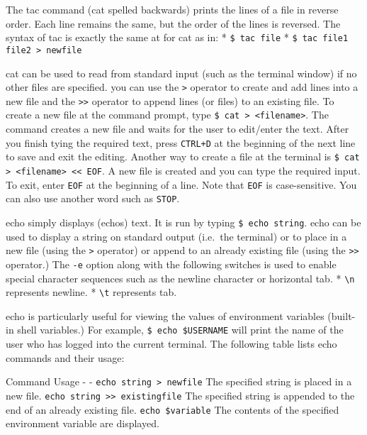 The tac command (cat spelled backwards) prints the lines of a file in
reverse order. Each line remains the same, but the order of the lines is
reversed. The syntax of tac is exactly the same at for cat as in: *
\texttt{\$ tac file} *
\texttt{\$ tac file1 file2 \textgreater{} newfile}

cat can be used to read from standard input (such as the terminal
window) if no other files are specified. you can use the
\texttt{\textgreater{}} operator to create and add lines into a new file
and the \texttt{\textgreater{}\textgreater{}} operator to append lines
(or files) to an existing file. To create a new file at the command
prompt, type
\texttt{\$ cat \textgreater{} \textless{}filename\textgreater{}}. The
command creates a new file and waits for the user to edit/enter the
text. After you finish tying the required text, press \texttt{CTRL+D} at
the beginning of the next line to save and exit the editing. Another way
to create a file at the terminal is
\texttt{\$ cat \textgreater{} \textless{}filename\textgreater{} \textless{}\textless{} EOF}.
A new file is created and you can type the required input. To exit,
enter \texttt{EOF} at the beginning of a line. Note that \texttt{EOF} is
case-sensitive. You can also use another word such as \texttt{STOP}.

echo simply displays (echos) text. It is run by typing
\texttt{\$ echo string}. echo can be used to display a string on
standard output (i.e.~the terminal) or to place in a new file (using the
\texttt{\textgreater{}} operator) or append to an already existing file
(using the \texttt{\textgreater{}\textgreater{}} operator.) The
\texttt{-e} option along with the following switches is used to enable
special character sequences such as the newline character or horizontal
tab. * \texttt{\textbackslash{}n} represents newline. *
\texttt{\textbackslash{}t} represents tab.

echo is particularly useful for viewing the values of environment
variables (built-in shell variables.) For example,
\texttt{\$ echo \$USERNAME} will print the name of the user who has
logged into the current terminal. The following table lists echo
commands and their usage:

Command \textbar{} Usage - \textbar{} -
\texttt{echo string \textgreater{} newfile} \textbar{} The specified
string is placed in a new file.
\texttt{echo string \textgreater{}\textgreater{} existingfile}
\textbar{} The specified string is appended to the end of an already
existing file. \texttt{echo \$variable} \textbar{} The contents of the
specified environment variable are displayed.

